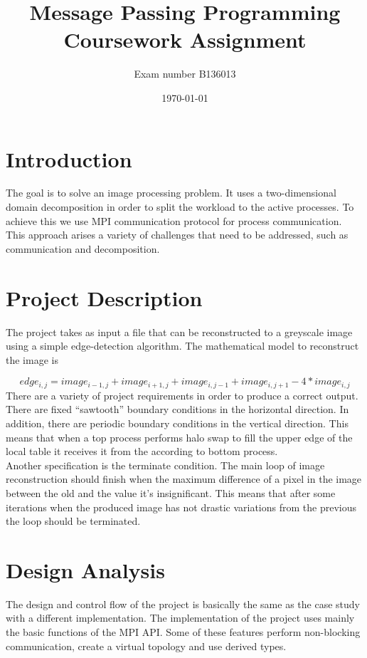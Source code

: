 \documentclass[12pt,a4paper]{article}
\newcommand{\sectionVspacing}{\vspace{15pt}}
\begin{document}
\title{Message Passing Programming Coursework Assignment}
\author{Exam number B136013}
\date{\today}

\makeEPCCtitle

\thispagestyle{empty}

\newpage
\clearpage

\tableofcontents

\newpage
\clearpage

\section{Introduction}
	The goal is to solve an image processing problem. It uses a two-dimensional domain decomposition in order to split the workload to the active processes. To achieve this we use MPI communication protocol for process communication. This approach arises a variety of challenges that need to be addressed, such as communication and decomposition.

\sectionVspacing

\section{Project Description}
  The project takes as input a file that can be reconstructed to a greyscale image using a simple edge-detection algorithm. The mathematical model to reconstruct the image is

  \begin{equation}
  edge_{i, j} = image_{i-1, j} + image_{i+1, j} + image_{i, j-1} + image_{i, j+1} - 4*image_{i, j}
  \end{equation}
  There are a variety of project requirements in order to produce a correct output. There are fixed “sawtooth” boundary conditions in the horizontal direction. In addition, there are periodic boundary conditions in the vertical direction. This means that when a top process performs halo swap to fill the upper edge of the local table it receives it from the according to bottom process.\\
  Another specification is the terminate condition. The main loop of image reconstruction should finish when the maximum difference of a pixel in the image between the old and the value it's insignificant. This means that after some iterations when the produced image has not drastic variations from the previous the loop should be terminated.

\sectionVspacing

\section{Design Analysis}
	The design and control flow of the project is basically the same as the case study with a different implementation. The implementation of the project uses mainly the basic functions of the MPI API. Some of these features perform non-blocking communication, create a virtual topology and use derived types.
\end{document}
